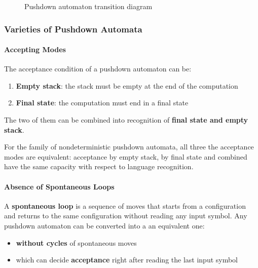 \documentclass[english]{article}
\begin{document}
\begin{figure}[htbp]
  \centering
  \bigskip
  \caption{Pushdown automaton transition diagram}
  \label{fig:pushdown-automaton-transition-diagram}
  \bigskip
\end{figure}

\subsubsection{Varieties of Pushdown Automata}

\paragraph{Accepting Modes}

The acceptance condition of a pushdown automaton can be:

\begin{enumerate}
  \item \textbf{Empty stack}: the stack must be empty at the end of the computation
  \item \textbf{Final state}: the computation must end in a final state
\end{enumerate}

The two of them can be combined into recognition of \textbf{final state and empty stack}.

For the family of nondeterministic pushdown automata, all three the acceptance modes are equivalent:
acceptance by empty stack, by final state and combined have the same capacity with respect to language recognition.

\paragraph{Absence of Spontaneous Loops}

A \textbf{spontaneous loop} is a sequence of moves that starts from a configuration and returns to the same configuration without reading any input symbol.
Any pushdown automaton can be converted into a an equivalent one:

\begin{itemize}
  \item \textbf{without cycles} of spontaneous moves
  \item which can decide \textbf{acceptance} right after reading the last input symbol
\end{itemize}
\end{document}
